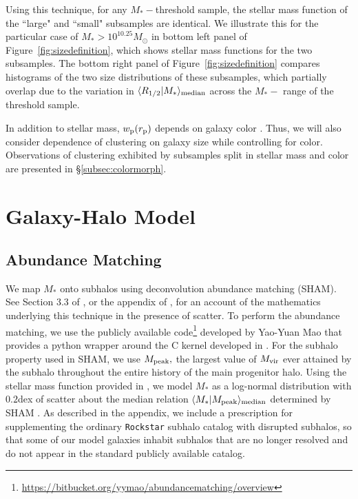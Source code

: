 \documentclass[usenatbib,usegraphicx,letterpaper]{mn2e}
\newcommand{\rhalf}{R_{1/2}}
\newcommand{\mstar}{M_{\ast}}
\newcommand{\mvir}{M_{\rm vir}}
\newcommand{\mpeak}{M_{\rm peak}}
\newcommand{\rproj}{r_{\rm p}}
\newcommand{\wproj}{w_{\rm p}}
\newcommand{\median}[2]{\langle{#1}\vert{#2}\rangle_{\rm median}}
\newcommand{\msun}{M_\odot}
\begin{document}
Using this technique, for any $\mstar-$threshold sample, the stellar mass function of the ``large" and ``small" subsamples are identical. We illustrate this for the particular case of $\mstar>10^{10.25}\msun$ in bottom left panel of Figure~\ref{fig:sizedefinition}, which shows stellar mass functions for the two subsamples. The bottom right panel of Figure~\ref{fig:sizedefinition} compares histograms of the two size distributions of these subsamples, which partially overlap due to the variation in $\median{\rhalf}{\mstar}$ across the $\mstar-$ range of the threshold sample.

In addition to stellar mass, $\wproj(\rproj)$ depends on galaxy color \citep[e.g.,][]{zehavi_etal11}. Thus, we will also consider
dependence of clustering on galaxy size while controlling for color. Observations of clustering exhibited by subsamples split in stellar mass and color are presented in \S\ref{subsec:colormorph}.

\section{Galaxy-Halo Model}
\label{sec:model}

\subsection{Abundance Matching}
\label{subsec:sham}

We map $\mstar$ onto subhalos using deconvolution abundance matching (SHAM). See Section 3.3 of \citet{behroozi_etal10}, or the appendix of \citet{kravtsov_etal14}, for an account of the mathematics underlying this technique in the presence of scatter. To perform the abundance matching, we use the publicly available code\footnote{\url{https://bitbucket.org/yymao/abundancematching/overview}} developed by Yao-Yuan Mao \citep{lehmann_etal15} that provides a python wrapper around the C kernel developed in \citep{behroozi_etal10}. For the subhalo property used in SHAM, we use $\mpeak,$ the largest value of $\mvir$ ever attained by the subhalo throughout the entire history of the main progenitor halo.  Using the stellar mass function provided in \citet{moustakas_etal13}, we model $\mstar$ as a log-normal distribution with $0.2$dex of scatter about the median relation $\median{\mstar}{\mpeak}$ determined by SHAM \citep{reddick_etal13}. As described in the appendix, we include a prescription for supplementing the ordinary {\tt Rockstar} subhalo catalog with disrupted subhalos, so that some of our model galaxies inhabit subhalos that are no longer resolved and do not appear in the standard publicly available catalog.
\end{document}
